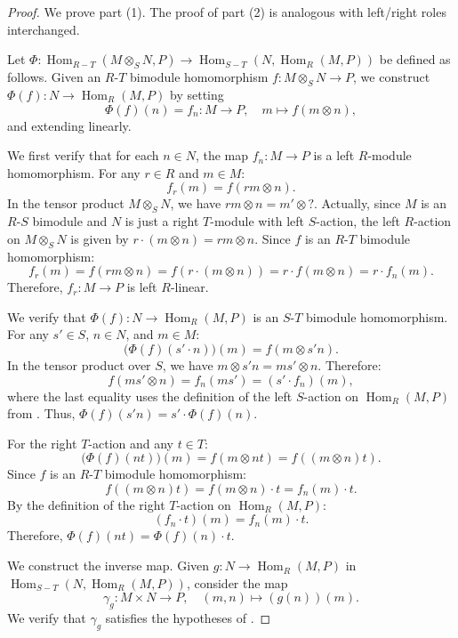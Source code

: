 \begin{proof}
    We prove part (1). The proof of part (2) is analogous with left/right roles interchanged.

    Let $\Phi : \operatorname{Hom}_{R-T}(M \otimes_S N, P) \to \operatorname{Hom}_{S-T}(N, \operatorname{Hom}_R(M, P))$ be defined as follows. Given an $R$-$T$ bimodule homomorphism $f : M \otimes_S N \to P$, we construct $\Phi(f) : N \to \operatorname{Hom}_R(M, P)$ by setting
    $$\Phi(f)(n) = f_n : M \to P, \quad m \mapsto f(m \otimes n),$$
    and extending linearly.

    We first verify that for each $n \in N$, the map $f_n : M \to P$ is a left $R$-module homomorphism. For any $r \in R$ and $m \in M$:
    $$f_r(m) = f(rm \otimes n).$$
    In the tensor product $M \otimes_S N$, we have $rm \otimes n = m' \otimes ?$. Actually, since $M$ is an $R$-$S$ bimodule and $N$ is just a right $T$-module with left $S$-action, the left $R$-action on $M \otimes_S N$ is given by $r \cdot (m \otimes n) = rm \otimes n$. Since $f$ is an $R$-$T$ bimodule homomorphism:
    $$f_r(m) = f(rm \otimes n) = f(r \cdot (m \otimes n)) = r \cdot f(m \otimes n) = r \cdot f_n(m).$$
    Therefore, $f_r : M \to P$ is left $R$-linear.

    We verify that $\Phi(f) : N \to \operatorname{Hom}_R(M, P)$ is an $S$-$T$ bimodule homomorphism. For any $s' \in S$, $n \in N$, and $m \in M$:
    $$\bigl(\Phi(f)(s' \cdot n)\bigr)(m) = f(m \otimes s'n).$$
    In the tensor product over $S$, we have $m \otimes s'n = ms' \otimes n$. Therefore:
    $$f(ms' \otimes n) = f_n(ms') = (s' \cdot f_n)(m),$$
    where the last equality uses the definition of the left $S$-action on $\operatorname{Hom}_R(M, P)$ from . Thus, $\Phi(f)(s'n) = s' \cdot \Phi(f)(n)$.

    For the right $T$-action and any $t \in T$:
    $$\bigl(\Phi(f)(nt)\bigr)(m) = f(m \otimes nt) = f((m \otimes n)t).$$
    Since $f$ is an $R$-$T$ bimodule homomorphism:
    $$f((m \otimes n)t) = f(m \otimes n) \cdot t = f_n(m) \cdot t.$$
    By the definition of the right $T$-action on $\operatorname{Hom}_R(M, P)$:
    $$(f_n \cdot t)(m) = f_n(m) \cdot t.$$
    Therefore, $\Phi(f)(nt) = \Phi(f)(n) \cdot t$.

    We construct the inverse map. Given $g : N \to \operatorname{Hom}_R(M, P)$ in $\operatorname{Hom}_{S-T}(N, \operatorname{Hom}_R(M, P))$, consider the map
    $$\gamma_g : M \times N \to P, \quad (m,n) \mapsto (g(n))(m).$$
    We verify that $\gamma_g$ satisfies the hypotheses of .


\end{proof}
